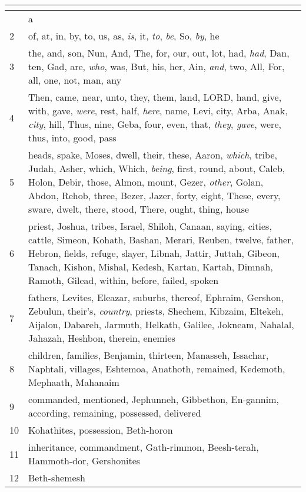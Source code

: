 \begin{center}
\begin{longtable}{l|p{3.75in}}
\hline \multicolumn{2}{c}{{ }} \\ \hline
\endfoot 
1 & a\\ \hline 
2 & of, at, in, by, to, us, as, \emph{is}, it, \emph{to}, \emph{be}, So, \emph{by}, he\\ \hline 
3 & the, and, son, Nun, And, The, for, our, out, lot, had, \emph{had}, Dan, ten, Gad, are, \emph{who}, was, But, his, her, Ain, \emph{and}, two, All, For, all, one, not, man, any\\ \hline 
4 & Then, came, near, unto, they, them, land, LORD, hand, give, with, gave, \emph{were}, rest, half, \emph{here}, name, Levi, city, Arba, Anak, \emph{city}, hill, Thus, nine, Geba, four, even, that, \emph{they}, \emph{gave}, were, thus, into, good, pass\\ \hline 
5 & heads, spake, Moses, dwell, their, these, Aaron, \emph{which}, tribe, Judah, Asher, which, Which, \emph{being}, first, round, about, Caleb, Holon, Debir, those, Almon, mount, Gezer, \emph{other}, Golan, Abdon, Rehob, three, Bezer, Jazer, forty, eight, These, every, sware, dwelt, there, stood, There, ought, thing, house\\ \hline 
6 & priest, Joshua, tribes, Israel, Shiloh, Canaan, saying, cities, cattle, Simeon, Kohath, Bashan, Merari, Reuben, twelve, father, Hebron, fields, refuge, slayer, Libnah, Jattir, Juttah, Gibeon, Tanach, Kishon, Mishal, Kedesh, Kartan, Kartah, Dimnah, Ramoth, Gilead, within, before, failed, spoken\\ \hline 
7 & fathers, Levites, Eleazar, suburbs, thereof, Ephraim, Gershon, Zebulun, their's, \emph{country}, priests, Shechem, Kibzaim, Eltekeh, Aijalon, Dabareh, Jarmuth, Helkath, Galilee, Jokneam, Nahalal, Jahazah, Heshbon, therein, enemies\\ \hline 
8 & children, families, Benjamin, thirteen, Manasseh, Issachar, Naphtali, villages, Eshtemoa, Anathoth, remained, Kedemoth, Mephaath, Mahanaim\\ \hline 
9 & commanded, mentioned, Jephunneh, Gibbethon, En-gannim, according, remaining, possessed, delivered\\ \hline 
10 & Kohathites, possession, Beth-horon\\ \hline 
11 & inheritance, commandment, Gath-rimmon, Beesh-terah, Hammoth-dor, Gershonites\\ \hline 
12 & Beth-shemesh\\ \hline 
\end{longtable}
\end{center}





